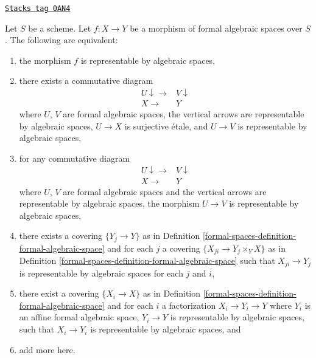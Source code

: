\begin{lemma}
\label{formal-spaces-lemma-representable-by-algebraic-spaces-local}
\href{https://stacks.math.columbia.edu/tag/0AN4}{\texttt{Stacks tag 0AN4}}

Let $S$ be a scheme. Let $f : X \to Y$ be a morphism of formal algebraic
spaces over $S$. The following are equivalent:
\begin{enumerate}
\item the morphism $f$ is representable by algebraic spaces,
\item there exists a commutative diagram
$$
\begin{array}{cc}U \downarrow\longrightarrow & V \downarrow \\ X \longrightarrow & Y\end{array}
$$
where $U$, $V$ are formal algebraic spaces, the vertical arrows are
representable by algebraic spaces, $U \to X$
is surjective \'etale, and $U \to V$ is representable by algebraic spaces,
\item for any commutative diagram
$$
\begin{array}{cc}U \downarrow\longrightarrow & V \downarrow \\ X \longrightarrow & Y\end{array}
$$
where $U$, $V$ are formal algebraic spaces and the vertical arrows are
representable by algebraic spaces, the morphism $U \to V$ is
representable by algebraic spaces,
\item there exists a covering $\{Y_j \to Y\}$ as in
Definition \ref{formal-spaces-definition-formal-algebraic-space}
and for each $j$ a covering $\{X_{ji} \to Y_j \times_Y X\}$ as in
Definition \ref{formal-spaces-definition-formal-algebraic-space} such that
$X_{ji} \to Y_j$ is representable by algebraic spaces for each $j$ and $i$,
\item there exist a covering $\{X_i \to X\}$ as in
Definition \ref{formal-spaces-definition-formal-algebraic-space}
and for each $i$ a factorization $X_i \to Y_i \to Y$ where $Y_i$
is an affine formal algebraic space, $Y_i \to Y$ is representable
by algebraic spaces, such that $X_i \to Y_i$ is representable by algebraic
spaces, and
\item add more here.
\end{enumerate}
\end{lemma}


